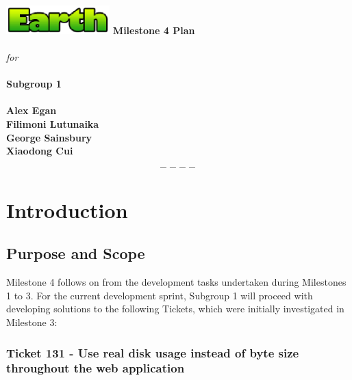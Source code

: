 \documentclass[10pt,a4,oneside]{article}
\begin{document}
\begin{titlepage}
\begin{center}
\includegraphics[width=40mm]{figs/earth}
\vfill
\textbf{\huge Milestone 4 Plan}\\ \textit{} \\ \textit{} 
\textit{for} \\ \textit{} \\ \textit{} 
\textbf{\huge Subgroup 1}\\ \textit{} \\ \textit{}
\vfill
\textbf{Alex Egan \\ Filimoni Lutunaika \\ George Sainsbury \\ Xiaodong Cui}
\end{center}
\end{titlepage}
 


\newpage

\tableofcontents

\[----\]

\paragraph{}

\listoffigures
 
\newpage

\section{Introduction} 
 
\subsection{Purpose and Scope}

\label{subsec:purpose-and-scope}
 
Milestone 4 follows on from the development tasks undertaken during Milestones 1 to 3.
For the current development sprint, Subgroup 1 will proceed with developing solutions 
to the following Tickets, which were initially investigated in Milestone 3:

\subsubsection*{ Ticket 131 - Use real disk usage instead of byte size throughout the web application}
\end{document}
